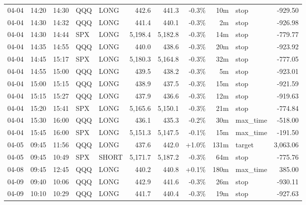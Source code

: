 \documentclass[11pt,a4paper,twoside]{article}
\begin{document}
\begin{center}
\begin{longtable}{>{\color{txtmain}}l l l l l r r r r >{\color{txtmain}}l r}
04-04 & 14:20 & 14:30 & QQQ & LONG & 442.6 & 441.3 & \textcolor{lossred}{-0.3\%} & 10m & stop & \textcolor{lossred}{-929.50} \\
04-04 & 14:30 & 14:32 & QQQ & LONG & 441.4 & 440.1 & \textcolor{lossred}{-0.3\%} & 2m & stop & \textcolor{lossred}{-926.98} \\
04-04 & 14:30 & 14:44 & SPX & LONG & 5,198.4 & 5,182.8 & \textcolor{lossred}{-0.3\%} & 14m & stop & \textcolor{lossred}{-779.77} \\
04-04 & 14:35 & 14:55 & QQQ & LONG & 440.0 & 438.6 & \textcolor{lossred}{-0.3\%} & 20m & stop & \textcolor{lossred}{-923.92} \\
04-04 & 14:45 & 15:17 & SPX & LONG & 5,180.3 & 5,164.8 & \textcolor{lossred}{-0.3\%} & 32m & stop & \textcolor{lossred}{-777.05} \\
04-04 & 14:55 & 15:00 & QQQ & LONG & 439.5 & 438.2 & \textcolor{lossred}{-0.3\%} & 5m & stop & \textcolor{lossred}{-923.01} \\
04-04 & 15:00 & 15:15 & QQQ & LONG & 438.9 & 437.5 & \textcolor{lossred}{-0.3\%} & 15m & stop & \textcolor{lossred}{-921.59} \\
04-04 & 15:15 & 15:27 & QQQ & LONG & 437.9 & 436.6 & \textcolor{lossred}{-0.3\%} & 12m & stop & \textcolor{lossred}{-919.63} \\
04-04 & 15:20 & 15:41 & SPX & LONG & 5,165.6 & 5,150.1 & \textcolor{lossred}{-0.3\%} & 21m & stop & \textcolor{lossred}{-774.84} \\
04-04 & 15:30 & 16:00 & QQQ & LONG & 436.1 & 435.3 & \textcolor{lossred}{-0.2\%} & 30m & max\_time & \textcolor{lossred}{-518.00} \\
04-04 & 15:45 & 16:00 & SPX & LONG & 5,151.3 & 5,147.5 & \textcolor{lossred}{-0.1\%} & 15m & max\_time & \textcolor{lossred}{-191.50} \\
04-05 & 09:45 & 11:56 & QQQ & LONG & 437.6 & 442.0 & \textcolor{wingreen}{+1.0\%} & 131m & target & \textcolor{wingreen}{3,063.06} \\
04-05 & 09:45 & 10:49 & SPX & SHORT & 5,171.7 & 5,187.2 & \textcolor{lossred}{-0.3\%} & 64m & stop & \textcolor{lossred}{-775.76} \\
04-08 & 09:45 & 12:45 & QQQ & LONG & 440.2 & 440.8 & \textcolor{wingreen}{+0.1\%} & 180m & max\_time & \textcolor{wingreen}{385.00} \\
04-09 & 09:40 & 10:06 & QQQ & LONG & 442.9 & 441.6 & \textcolor{lossred}{-0.3\%} & 26m & stop & \textcolor{lossred}{-930.11} \\
04-09 & 10:10 & 10:29 & QQQ & LONG & 441.7 & 440.4 & \textcolor{lossred}{-0.3\%} & 19m & stop & \textcolor{lossred}{-927.63} \\

\end{longtable}
\end{center}
\end{document}

